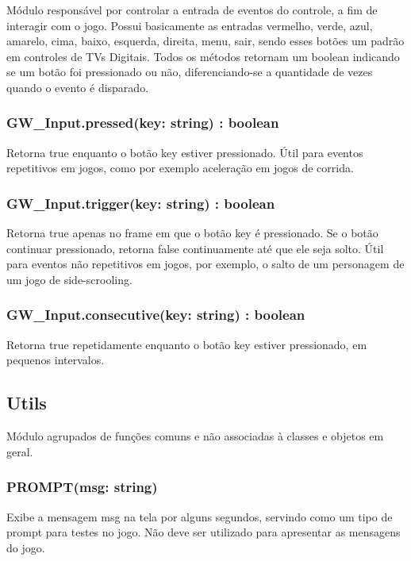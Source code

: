 \documentclass[
	12pt,				%
	openright,			%
	oneside,			%
	a4paper,			%
	brazil,				%
	]{abntex2}
\begin{document}
Módulo responsável por controlar a entrada de eventos do controle, a fim de interagir com o jogo. Possui basicamente as entradas vermelho, verde, azul, amarelo, cima, baixo, esquerda, direita, menu, sair, sendo esses botões um padrão em controles de TVs Digitais.  Todos os métodos retornam um boolean indicando se um botão foi pressionado ou não, diferenciando-se a quantidade de vezes quando o evento é disparado.

\subsubsection{GW\_Input.pressed(key: string) : boolean}

Retorna true enquanto o botão key estiver pressionado. Útil para eventos repetitivos em jogos, como por exemplo aceleração em jogos de corrida.

\subsubsection{GW\_Input.trigger(key: string) : boolean}

Retorna true apenas no frame em que o botão key é pressionado. Se o botão continuar pressionado, retorna false continuamente até que ele seja solto. Útil para eventos não repetitivos em jogos, por exemplo, o salto de um personagem de um jogo de side-scrooling.

\subsubsection{GW\_Input.consecutive(key: string) : boolean}

Retorna true repetidamente enquanto o botão key estiver pressionado, em pequenos intervalos. 

\subsection{Utils}

Módulo agrupados de funções comuns e não associadas à classes e objetos em geral. 

\subsubsection{PROMPT(msg: string)}

Exibe a mensagem msg na tela por alguns segundos, servindo como um tipo de prompt para testes no jogo. Não deve ser utilizado para apresentar as mensagens do jogo.
\end{document}
